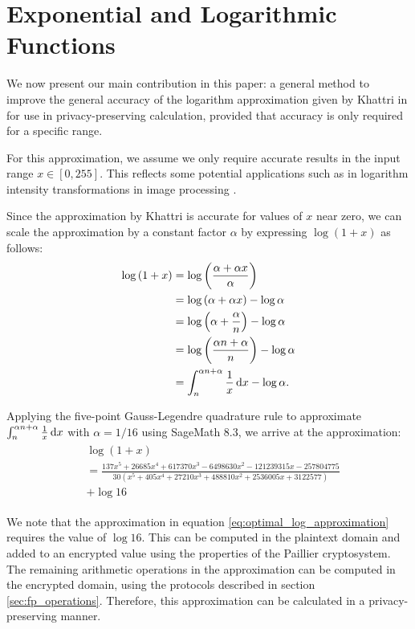 \section{Exponential and Logarithmic Functions}
We now present our main contribution in this paper: a general method to improve the general accuracy of the logarithm approximation given by Khattri in \cite{khattri_new_2009} for use in privacy-preserving calculation, provided that accuracy is only required for a specific range.

For this approximation, we assume we only require accurate results in the input range $x \in [0, 255]$. This reflects some potential applications such as in logarithm intensity transformations in image processing \cite{gonzalez_digital_2008}.

Since the approximation by Khattri is accurate for values of $x$ near zero, we can scale the approximation by a constant factor $\alpha$ by expressing $\log(1+x)$ as follows:
\begin{align*}
	\log{(1+x)} &= \log{\left(\frac{\alpha + \alpha x}{\alpha}\right)}\\
	&= \log{(\alpha + \alpha x)} - \log{\alpha}\\
	&= \log{\left(\alpha+\frac{\alpha}{n}\right)} - \log{\alpha}\\
	&= \log{\left(\frac{\alpha n + \alpha}{n}\right)} - \log{\alpha}\\
	&= \int_{n}^{\alpha n + \alpha}{\frac{1}{x}\mathop{}\!\mathrm{d} x} - \log{\alpha}.
\end{align*}

Applying the five-point Gauss-Legendre quadrature rule to approximate $\int_{n}^{\alpha n + \alpha}{\frac{1}{x}\mathop{}\!\mathrm{d} x}$ with $\alpha = 1/16$ using SageMath 8.3, we arrive at the approximation:
\begin{align}\label{eq:optimal_log_approximation}
	\begin{split}
		&\log(1+x) \\
		&=\frac{137x^5 + 26685x^4 + 617370x^3 - 6498630x^2 - 121239315x - 257804775}
		{30(x^5 + 405x^4 + 27210x^3 + 488810x^2 + 2536005x + 3122577)}\\
		&+ \log{16}
	\end{split}
\end{align}

We note that the approximation in equation \ref{eq:optimal_log_approximation} requires the value of $\log{16}$. This can be computed in the plaintext domain and added to an encrypted value using the properties of the Paillier cryptosystem. The remaining arithmetic operations in the approximation can be computed in the encrypted domain, using the protocols described in section \ref{sec:fp_operations}. Therefore, this approximation can be calculated in a privacy-preserving manner.

